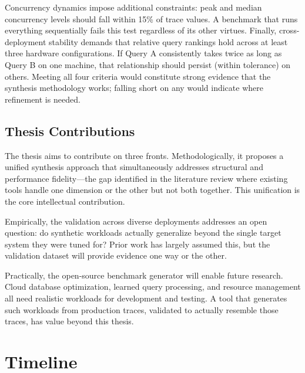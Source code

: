 \documentclass[12pt]{report}
\begin{document}
Concurrency dynamics impose additional constraints: peak and median concurrency levels should fall within 15\% of trace values. A benchmark that runs everything sequentially fails this test regardless of its other virtues. Finally, cross-deployment stability demands that relative query rankings hold across at least three hardware configurations. If Query A consistently takes twice as long as Query B on one machine, that relationship should persist (within tolerance) on others. Meeting all four criteria would constitute strong evidence that the synthesis methodology works; falling short on any would indicate where refinement is needed.

\subsection{Thesis Contributions}
\label{subsec:contributions}

The thesis aims to contribute on three fronts. Methodologically, it proposes a unified synthesis approach that simultaneously addresses structural and performance fidelity---the gap identified in the literature review where existing tools handle one dimension or the other but not both together. This unification is the core intellectual contribution.

Empirically, the validation across diverse deployments addresses an open question: do synthetic workloads actually generalize beyond the single target system they were tuned for? Prior work has largely assumed this, but the validation dataset will provide evidence one way or the other.

Practically, the open-source benchmark generator will enable future research. Cloud database optimization, learned query processing, and resource management all need realistic workloads for development and testing. A tool that generates such workloads from production traces, validated to actually resemble those traces, has value beyond this thesis.

\section{Timeline}
\label{sec:timeline}
\end{document}
